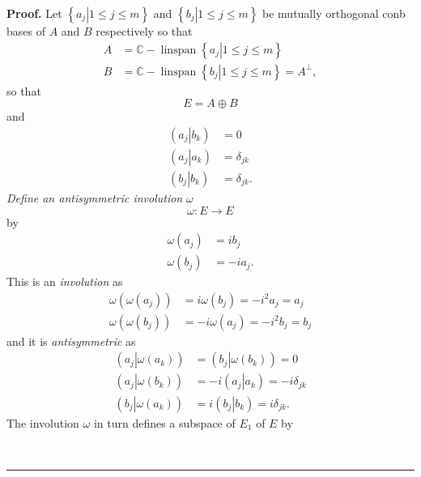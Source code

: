 \documentclass[aps,preprint]{revtex4}%
\newenvironment{proof}[1][Proof]{\noindent\textbf{#1.} }{\ \rule{0.5em}{0.5em}}
\begin{document}
\begin{proof}
Let $\left\{  \left.  a_{j}\right\vert 1\leq j\leq m\right\}  $ and $\left\{
\left.  b_{j}\right\vert 1\leq j\leq m\right\}  $ be mutually orthogonal conb
bases of $A$ and $B$ respectively so that
\begin{align}
A &  =\mathbb{C-}\operatorname*{linspan}\left\{  \left.  a_{j}\right\vert
1\leq j\leq m\right\}  \\
B &  =\mathbb{C-}\operatorname*{linspan}\left\{  \left.  b_{j}\right\vert
1\leq j\leq m\right\}  =A^{\bot},
\end{align}
so that
\begin{equation}
E=A\oplus B
\end{equation}
and
\begin{align}
\left(  \left.  a_{j}\right\vert b_{k}\right)   &  =0\\
\left(  \left.  a_{j}\right\vert a_{k}\right)   &  =\delta_{jk}\\
\left(  \left.  b_{j}\right\vert b_{k}\right)   &  =\delta_{jk}.
\end{align}
\emph{Define an antisymmetric involution} $\omega$
\begin{equation}
\omega:E\rightarrow E
\end{equation}
by%
\begin{align}
\omega\left(  a_{j}\right)   &  =ib_{j}\\
\omega\left(  b_{j}\right)   &  =-ia_{j}.
\end{align}
This is an \emph{involution} as
\begin{align}
\omega\left(  \omega\left(  a_{j}\right)  \right)   &  =i\omega\left(
b_{j}\right)  =-i^{2}a_{j}=a_{j}\\
\omega\left(  \omega\left(  b_{j}\right)  \right)   &  =-i\omega\left(
a_{j}\right)  =-i^{2}b_{j}=b_{j}%
\end{align}
and it is \emph{antisymmetric} as
\begin{align}
\left(  \left.  a_{j}\right\vert \omega\left(  a_{k}\right)  \right)   &
=\left(  \left.  b_{j}\right\vert \omega\left(  b_{k}\right)  \right)  =0\\
\left(  \left.  a_{j}\right\vert \omega\left(  b_{k}\right)  \right)   &
=-i\left(  \left.  a_{j}\right\vert a_{k}\right)  =-i\delta_{jk}\\
\left(  \left.  b_{j}\right\vert \omega\left(  a_{k}\right)  \right)   &
=i\left(  \left.  b_{j}\right\vert b_{k}\right)  =i\delta_{jk}.
\end{align}
The involution $\omega$ in turn defines a subspace of $E_{1}$ of $E$ by

\end{proof}
\end{document}
